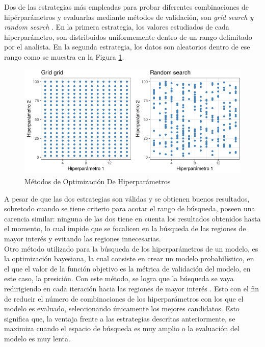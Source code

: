 Dos de las estrategias más empleadas para probar diferentes combinaciones de hipérparámetros y evaluarlas mediante métodos de validación, son \textit{grid search y random search} \cite{liashchynskyi2019grid}. En la primera estrategia, los valores estudiados de cada hiperparámetro, son distribuidos uniformemente dentro de un rango delimitado por el analista. En la segunda estrategia, los datos son aleatorios dentro de ese rango como se muestra en la Figura \ref{fig:Hiperparámetros grid search y random search}.

\begin{figure}[ht]
	\centering
	\includegraphics[scale=0.6]{Figs/121.png}
	\caption{Métodos de Optimización De Hiperparámetros}
	\label{fig:Hiperparámetros grid search y random search}
\end{figure}

A pesar de que las dos estrategias son válidas y se obtienen buenos resultados, sobretodo cuando se tiene criterio para acotar el rango de búsqueda, poseen una carencia similar: ninguna de las dos tiene en cuenta los resultados obtenidos hasta el momento, lo cual impide que se focalicen en la búsqueda de las regiones de mayor interés y evitando las regiones innecesarias.\\


Otro método utilizado para la búsqueda de los hiperparámetros de un modelo, es la optimización bayesiana, la cual consiste en crear un modelo probabilístico, en el que el valor de la función objetivo es la métrica de validación del modelo, en este caso, la presición. Con este método, se logra que la búsqueda se vaya redirigiendo en cada iteración hacia las regiones de mayor interés \cite{frazier2018tutorial}. Esto con el fin de reducir el número de combinaciones de los hiperparámetros con los que el modelo es evaluado, seleccionando únicamente los mejores candidatos. Esto significa que, la ventaja frente a las estrategias descritas anteriormente, se maximiza cuando el espacio de búsqueda es muy amplio o la evaluación del modelo es muy lenta.\\

